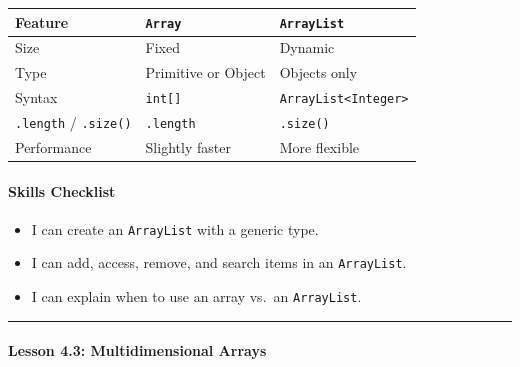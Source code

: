 \documentclass[
  justified,
  openright,
]{tufte-book}
\let\subsection\paragraph
\let\paragraph\paragraph
\let\subsection\paragraph
\let\paragraph\paragraph
\providecommand{\tightlist}{%
  \setlength{\itemsep}{0pt}\setlength{\parskip}{0pt}}
\begin{document}
\begin{fullwidth}{\def\LTcaptype{none} %
\begin{longtable}[]{@{}lll@{}}
\toprule\noalign{}
Feature & \texttt{Array} & \texttt{ArrayList} \\
\midrule\noalign{}
\endhead
\bottomrule\noalign{}
\endlastfoot
Size & Fixed & Dynamic \\
Type & Primitive or Object & Objects only \\
Syntax & \texttt{int{[}{]}} &
\texttt{ArrayList\textless{}Integer\textgreater{}} \\
\texttt{.length} / \texttt{.size()} & \texttt{.length} &
\texttt{.size()} \\
Performance & Slightly faster & More flexible \\
\end{longtable}
}
\end{fullwidth}

\subsection{Skills Checklist}\label{skills-checklist-78}

\begin{itemize}
\tightlist
\item[$\square$]
  I can create an \texttt{ArrayList} with a generic type.
\item[$\square$]
  I can add, access, remove, and search items in an \texttt{ArrayList}.
\item[$\square$]
  I can explain when to use an array vs.~an \texttt{ArrayList}.
\end{itemize}

\begin{center}\rule{0.5\linewidth}{0.5pt}\end{center}

\subsection{Lesson 4.3: Multidimensional
Arrays}\label{lesson-4.3-multidimensional-arrays}
\end{document}
